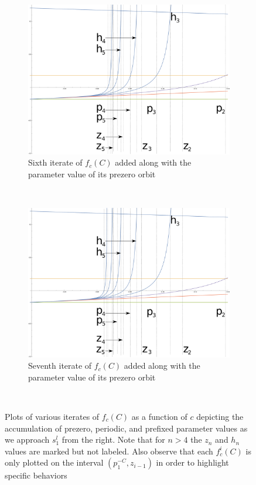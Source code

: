 \begin{figure}[ht]
\begin{subfigure}[b]{0.5\textwidth}
		\end{subfigure}
		\begin{subfigure}[b]{0.5\textwidth}
				\includegraphics[width=\textwidth]{./img/cplot5S}
				\caption{Sixth iterate of $f_c (C)$ added along with the parameter value of its prezero orbit}
				\label{fig:cplot5S}
		\end{subfigure}%
		~ %
		\begin{subfigure}[b]{0.5\textwidth}
				\includegraphics[width=\textwidth]{./img/cplot6S}
				\caption{Seventh iterate of $f_c (C)$ added along with the parameter value of its prezero orbit}
				\label{fig:cplot6S}
		\end{subfigure}
		~ %
		\caption{Plots of various iterates of $f_c (C)$ as a function of $c$ depicting the accumulation of prezero, periodic, and prefixed parameter values as we approach $s_1^l$ from the right. Note that for $n > 4$ the $z_n$ and $h_n$ values are marked but not labeled. Also observe that each $f^i_c (C)$ is only plotted on the interval $ (p_{1}^{-C}, z_{i-1})$ in order to highlight specific behaviors}\label{fig:iterh2}
\end{figure}
\FloatBarrier